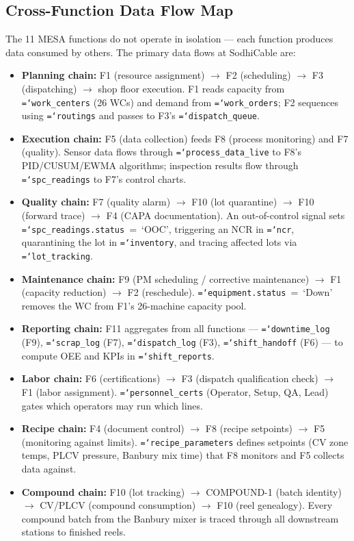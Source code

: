 \documentclass[11pt]{article}
\newcommand{\tfield}[1]{\texttt{\hyphenchar\font=`\-\relax #1}}
\begin{document}
\subsection{Cross-Function Data Flow Map}

The 11 MESA functions do not operate in isolation --- each function produces data consumed by others.  The primary data flows at SodhiCable are:

\begin{itemize}[leftmargin=1.8em, itemsep=1pt]
\item \textbf{Planning chain:} F1 (resource assignment) $\to$ F2 (scheduling) $\to$ F3 (dispatching) $\to$ shop floor execution.  F1 reads capacity from \tfield{work\_centers} (26 WCs) and demand from \tfield{work\_orders}; F2 sequences using \tfield{routings} and passes to F3's \tfield{dispatch\_queue}.
\item \textbf{Execution chain:} F5 (data collection) feeds F8 (process monitoring) and F7 (quality).  Sensor data flows through \tfield{process\_data\_live} to F8's PID/CUSUM/EWMA algorithms; inspection results flow through \tfield{spc\_readings} to F7's control charts.
\item \textbf{Quality chain:} F7 (quality alarm) $\to$ F10 (lot quarantine) $\to$ F10 (forward trace) $\to$ F4 (CAPA documentation).  An out-of-control signal sets \tfield{spc\_readings.status}~=~`OOC', triggering an NCR in \tfield{ncr}, quarantining the lot in \tfield{inventory}, and tracing affected lots via \tfield{lot\_tracking}.
\item \textbf{Maintenance chain:} F9 (PM scheduling / corrective maintenance) $\to$ F1 (capacity reduction) $\to$ F2 (reschedule).  \tfield{equipment.status}~=~`Down' removes the WC from F1's 26-machine capacity pool.
\item \textbf{Reporting chain:} F11 aggregates from all functions --- \tfield{downtime\_log} (F9), \tfield{scrap\_log} (F7), \tfield{dispatch\_log} (F3), \tfield{shift\_handoff} (F6) --- to compute OEE and KPIs in \tfield{shift\_reports}.
\item \textbf{Labor chain:} F6 (certifications) $\to$ F3 (dispatch qualification check) $\to$ F1 (labor assignment).  \tfield{personnel\_certs} (Operator, Setup, QA, Lead) gates which operators may run which lines.
\item \textbf{Recipe chain:} F4 (document control) $\to$ F8 (recipe setpoints) $\to$ F5 (monitoring against limits).  \tfield{recipe\_parameters} defines setpoints (CV zone temps, PLCV pressure, Banbury mix time) that F8 monitors and F5 collects data against.
\item \textbf{Compound chain:} F10 (lot tracking) $\to$ COMPOUND-1 (batch identity) $\to$ CV/PLCV (compound consumption) $\to$ F10 (reel genealogy).  Every compound batch from the Banbury mixer is traced through all downstream stations to finished reels.
\end{itemize}
\end{document}
